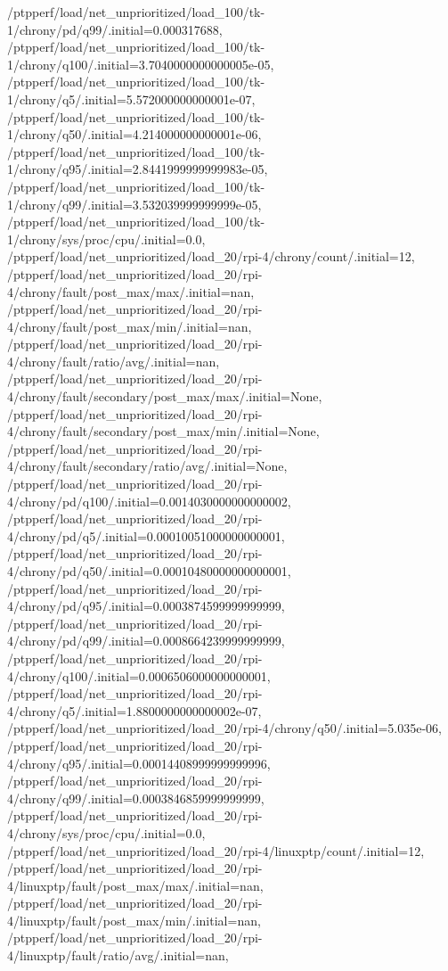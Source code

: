 {    /ptpperf/load/net_unprioritized/load_100/tk-1/chrony/pd/q99/.initial=0.000317688,
    /ptpperf/load/net_unprioritized/load_100/tk-1/chrony/q100/.initial=3.7040000000000005e-05,
    /ptpperf/load/net_unprioritized/load_100/tk-1/chrony/q5/.initial=5.572000000000001e-07,
    /ptpperf/load/net_unprioritized/load_100/tk-1/chrony/q50/.initial=4.214000000000001e-06,
    /ptpperf/load/net_unprioritized/load_100/tk-1/chrony/q95/.initial=2.8441999999999983e-05,
    /ptpperf/load/net_unprioritized/load_100/tk-1/chrony/q99/.initial=3.532039999999999e-05,
    /ptpperf/load/net_unprioritized/load_100/tk-1/chrony/sys/proc/cpu/.initial=0.0,
    /ptpperf/load/net_unprioritized/load_20/rpi-4/chrony/count/.initial=12,
    /ptpperf/load/net_unprioritized/load_20/rpi-4/chrony/fault/post_max/max/.initial=nan,
    /ptpperf/load/net_unprioritized/load_20/rpi-4/chrony/fault/post_max/min/.initial=nan,
    /ptpperf/load/net_unprioritized/load_20/rpi-4/chrony/fault/ratio/avg/.initial=nan,
    /ptpperf/load/net_unprioritized/load_20/rpi-4/chrony/fault/secondary/post_max/max/.initial=None,
    /ptpperf/load/net_unprioritized/load_20/rpi-4/chrony/fault/secondary/post_max/min/.initial=None,
    /ptpperf/load/net_unprioritized/load_20/rpi-4/chrony/fault/secondary/ratio/avg/.initial=None,
    /ptpperf/load/net_unprioritized/load_20/rpi-4/chrony/pd/q100/.initial=0.0014030000000000002,
    /ptpperf/load/net_unprioritized/load_20/rpi-4/chrony/pd/q5/.initial=0.00010051000000000001,
    /ptpperf/load/net_unprioritized/load_20/rpi-4/chrony/pd/q50/.initial=0.00010480000000000001,
    /ptpperf/load/net_unprioritized/load_20/rpi-4/chrony/pd/q95/.initial=0.0003874599999999999,
    /ptpperf/load/net_unprioritized/load_20/rpi-4/chrony/pd/q99/.initial=0.0008664239999999999,
    /ptpperf/load/net_unprioritized/load_20/rpi-4/chrony/q100/.initial=0.0006506000000000001,
    /ptpperf/load/net_unprioritized/load_20/rpi-4/chrony/q5/.initial=1.8800000000000002e-07,
    /ptpperf/load/net_unprioritized/load_20/rpi-4/chrony/q50/.initial=5.035e-06,
    /ptpperf/load/net_unprioritized/load_20/rpi-4/chrony/q95/.initial=0.00014408999999999996,
    /ptpperf/load/net_unprioritized/load_20/rpi-4/chrony/q99/.initial=0.0003846859999999999,
    /ptpperf/load/net_unprioritized/load_20/rpi-4/chrony/sys/proc/cpu/.initial=0.0,
    /ptpperf/load/net_unprioritized/load_20/rpi-4/linuxptp/count/.initial=12,
    /ptpperf/load/net_unprioritized/load_20/rpi-4/linuxptp/fault/post_max/max/.initial=nan,
    /ptpperf/load/net_unprioritized/load_20/rpi-4/linuxptp/fault/post_max/min/.initial=nan,
    /ptpperf/load/net_unprioritized/load_20/rpi-4/linuxptp/fault/ratio/avg/.initial=nan,
}

